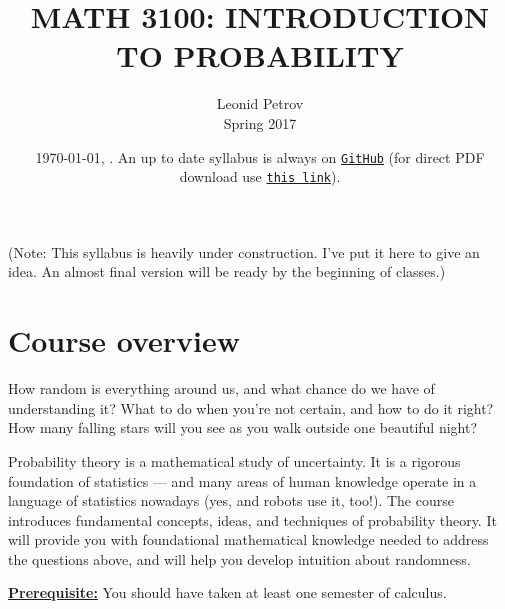\documentclass[oneside,11pt]{amsart}
\newcommand{\razdel}[1]{\smallskip\underline{\textbf{#1:}}\smallskip}
\newcommand{\note}[1]{{\Large\sf{}\color{blue}(#1)}}
\begin{document}
\title[MATH 3100: INTRODUCTION TO PROBABILITY]{MATH 3100: INTRODUCTION TO PROBABILITY}
\author{Leonid Petrov\\Spring 2017}
\date{\today, \currenttime. An up to date syllabus is always on \href{https://github.com/lenis2000/Syllabi/blob/master/Syllabus_3100_s17.pdf}{\texttt{GitHub}} (for direct PDF download use \href{https://github.com/lenis2000/Syllabi/raw/master/Syllabus_3100_s17.pdf}{\texttt{this link}}).}
\maketitle

\note{Note: This syllabus is heavily under construction. I've put it here to give an idea. An almost final version will be ready by the 
beginning of classes.}

\section{Course overview}

How random is everything around us, and what chance do we have of understanding it? 
What to do when you're not certain, and how to do it right?
How many falling stars will you see as you walk outside one beautiful night? 

Probability theory is a mathematical study of uncertainty.
It is a rigorous foundation of statistics --- and
many areas of human knowledge operate in a language of statistics nowadays
(yes, and robots use it, too!).
The course introduces fundamental concepts, ideas, and techniques of probability theory.
It  will provide you with foundational mathematical knowledge
needed to address the questions above, and 
will help you develop
intuition about randomness.

\razdel{Prerequisite} You should have taken at least one semester of calculus.
\end{document}
